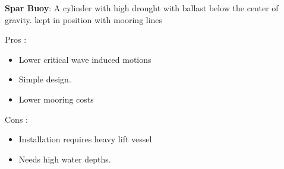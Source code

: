 \noindent \textbf{Spar Buoy}: A cylinder with high drought with ballast below the center of gravity. kept in position with mooring lines

\begin{varwidth}[t]{.5\textwidth}
Pros :
\begin{itemize}
\item Lower critical wave induced motions
\item Simple design.
\item Lower mooring costs 
\end{itemize}
\end{varwidth}%
\hspace{4em}%
\begin{varwidth}[t]{.5\textwidth}
Cons :
\begin{itemize}
\item Installation requires heavy lift vessel
\item Needs high water depths. 
\end{itemize}
\end{varwidth}


